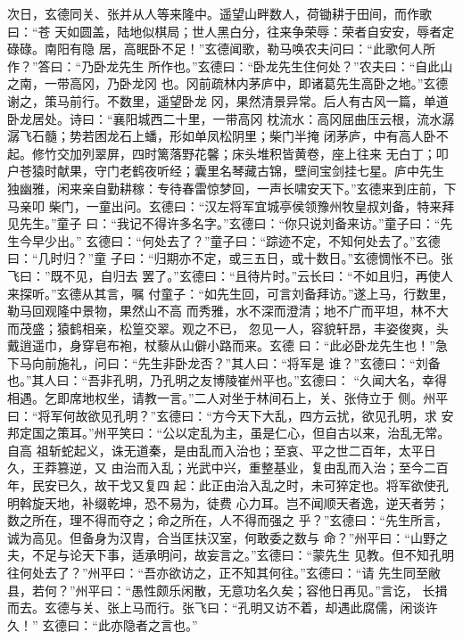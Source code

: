 次日，玄德同关、张并从人等来隆中。遥望山畔数人，荷锄耕于田间，而作歌曰：“苍
天如圆盖，陆地似棋局；世人黑白分，往来争荣辱：荣者自安安，辱者定碌碌。南阳有隐
居，高眠卧不足！”玄德闻歌，勒马唤农夫问曰：“此歌何人所作？”答曰：“乃卧龙先生
所作也。”玄德曰：“卧龙先生住何处？”农夫曰：“自此山之南，一带高冈，乃卧龙冈
也。冈前疏林内茅庐中，即诸葛先生高卧之地。”玄德谢之，策马前行。不数里，遥望卧龙
冈，果然清景异常。后人有古风一篇，单道卧龙居处。诗曰：“襄阳城西二十里，一带高冈
枕流水：高冈屈曲压云根，流水潺潺飞石髓；势若困龙石上蟠，形如单凤松阴里；柴门半掩
闭茅庐，中有高人卧不起。修竹交加列翠屏，四时篱落野花馨；床头堆积皆黄卷，座上往来
无白丁；叩户苍猿时献果，守门老鹤夜听经；囊里名琴藏古锦，壁间宝剑挂七星。庐中先生
独幽雅，闲来亲自勤耕稼：专待春雷惊梦回，一声长啸安天下。”玄德来到庄前，下马亲叩
柴门，一童出问。玄德曰：“汉左将军宜城亭侯领豫州牧皇叔刘备，特来拜见先生。”童子
曰：“我记不得许多名字。”玄德曰：“你只说刘备来访。”童子曰：“先生今早少出。”
玄德曰：“何处去了？”童子曰：“踪迹不定，不知何处去了。”玄德曰：“几时归？”童
子曰：“归期亦不定，或三五日，或十数日。”玄德惆怅不已。张飞曰：”既不见，自归去
罢了。”玄德曰：“且待片时。”云长曰：“不如且归，再使人来探听。”玄德从其言，嘱
付童子：“如先生回，可言刘备拜访。”遂上马，行数里，勒马回观隆中景物，果然山不高
而秀雅，水不深而澄清；地不广而平坦，林不大而茂盛；猿鹤相亲，松篁交翠。观之不已，
忽见一人，容貌轩昂，丰姿俊爽，头戴逍遥巾，身穿皂布袍，杖藜从山僻小路而来。玄德
曰：“此必卧龙先生也！”急下马向前施礼，问曰：“先生非卧龙否？”其人曰：“将军是
谁？”玄德曰：“刘备也。”其人曰：“吾非孔明，乃孔明之友博陵崔州平也。”玄德曰：
“久闻大名，幸得相遇。乞即席地权坐，请教一言。”二人对坐于林间石上，关、张侍立于
侧。州平曰：“将军何故欲见孔明？”玄德曰：“方今天下大乱，四方云扰，欲见孔明，求
安邦定国之策耳。”州平笑曰：“公以定乱为主，虽是仁心，但自古以来，治乱无常。自高
祖斩蛇起义，诛无道秦，是由乱而入治也；至哀、平之世二百年，太平日久，王莽篡逆，又
由治而入乱；光武中兴，重整基业，复由乱而入治；至今二百年，民安已久，故干戈又复四
起：此正由治入乱之时，未可猝定也。将军欲使孔明斡旋天地，补缀乾坤，恐不易为，徒费
心力耳。岂不闻顺天者逸，逆天者劳；数之所在，理不得而夺之；命之所在，人不得而强之
乎？”玄德曰：“先生所言，诚为高见。但备身为汉胄，合当匡扶汉室，何敢委之数与
命？”州平曰：“山野之夫，不足与论天下事，适承明问，故妄言之。”玄德曰：“蒙先生
见教。但不知孔明往何处去了？”州平曰：“吾亦欲访之，正不知其何往。”玄德曰：“请
先生同至敝县，若何？”州平曰：“愚性颇乐闲散，无意功名久矣；容他日再见。”言讫，
长揖而去。玄德与关、张上马而行。张飞曰：“孔明又访不着，却遇此腐儒，闲谈许久！”
玄德曰：“此亦隐者之言也。”

